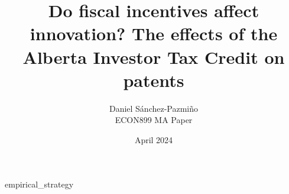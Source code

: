 \documentclass[12pt, a4paper]{article}
\title{Do fiscal incentives affect innovation? The effects of the Alberta Investor Tax Credit on patents}
\author{Daniel Sánchez-Pazmiño \\[1ex] ECON899 MA Paper}
\affil{Simon Fraser University}
\date{April 2024}
\renewenvironment{abstract}
 {\small
  \begin{center}
  \vspace{-1em}\vspace{0pt}
  \end{center}
  \quotation\itshape}
 {\endquotation}
\begin{document}

\maketitle

\begin{abstract}
    \lipsum[1]
\end{abstract}


{empirical_strategy}
\end{document}
